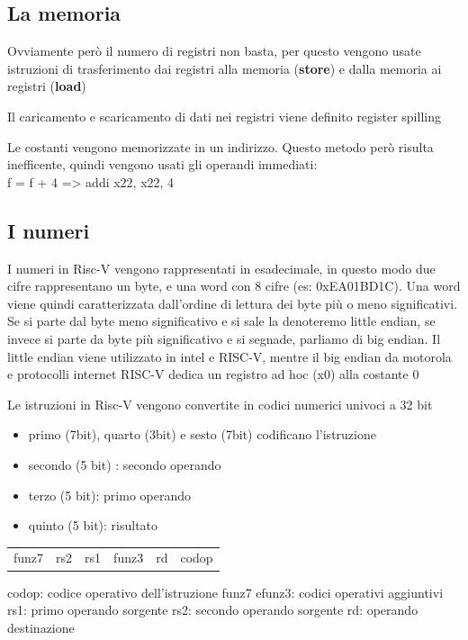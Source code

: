 \documentclass[12pt, a4paper]{article}
\begin{document}
\subsection{La memoria}
Ovviamente però il numero di registri non basta, per questo vengono usate istruzioni di 
trasferimento dai registri alla memoria (\textbf{store}) e dalla memoria ai registri
(\textbf{load}) 

Il caricamento e scaricamento di dati nei registri viene definito register spilling

Le costanti vengono memorizzate in un indirizzo. Questo metodo però risulta inefficente, quindi vengono usati gli operandi
immediati:\\
f = f + 4 => addi x22, x22, 4

\subsection{I numeri}

I numeri in Risc-V vengono rappresentati in esadecimale, in questo modo due cifre rappresentano un byte,
e una word con 8 cifre (es: 0xEA01BD1C). Una word viene quindi caratterizzata dall'ordine di lettura dei 
byte più o meno significativi. Se si parte dal byte meno significativo e si sale la denoteremo little endian,
se invece si parte da byte più significativo e si segnade, parliamo di big endian. Il little endian viene
utilizzato in intel e RISC-V, mentre il big endian da motorola e protocolli internet
RISC-V dedica un registro ad hoc (x0) alla costante 0

Le istruzioni in Risc-V vengono convertite in codici numerici univoci a 32 bit
\begin{itemize}
  \item primo (7bit), quarto (3bit) e sesto (7bit) codificano l'istruzione
  \item secondo (5 bit) : secondo operando
  \item terzo (5 bit): primo operando 
  \item quinto (5 bit): risultato
\end{itemize}
\begin{center}
  \begin{tabular}{c|c|c|c|c|c}
    funz7&rs2&rs1& funz3 & rd & codop 
  \end{tabular}
\end{center}
codop: codice operativo dell’istruzione
funz7 efunz3: codici operativi aggiuntivi
rs1: primo operando sorgente
rs2: secondo operando sorgente
rd: operando destinazione
\end{document}
